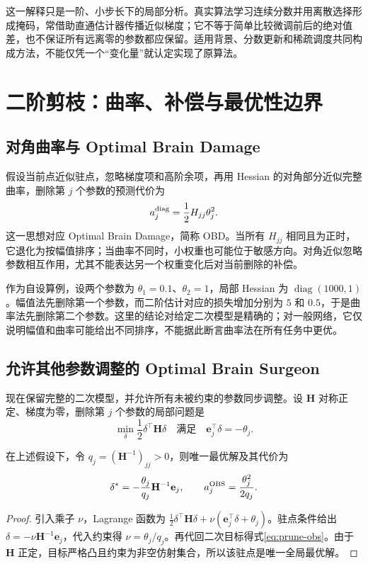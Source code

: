 \documentclass[UTF8,12pt,a4paper,fontset=fandol]{ctexart}
\begin{document}
这一解释只是一阶、小步长下的局部分析。真实算法学习连续分数并用离散选择形成掩码，常借助直通估计器传播近似梯度；它不等于简单比较微调前后的绝对值差，也不保证所有远离零的参数都应保留。适用背景、分数更新和稀疏调度共同构成方法，不能仅凭一个“变化量”就认定实现了原算法。

\section{二阶剪枝：曲率、补偿与最优性边界}
\label{sec:prune-second-order}

\subsection{对角曲率与 Optimal Brain Damage}
假设当前点近似驻点，忽略梯度项和高阶余项，再用 Hessian 的对角部分近似完整曲率，删除第 $j$ 个参数的预测代价为
\begin{equation}
 a_j^{\rm diag}=\frac12H_{jj}\theta_j^2.
 \label{eq:prune-obd}
\end{equation}
这一思想对应 Optimal Brain Damage，简称 OBD\cite{lecun1989}。当所有 $H_{jj}$ 相同且为正时，它退化为按幅值排序；当曲率不同时，小权重也可能位于敏感方向。对角近似忽略参数相互作用，尤其不能表达另一个权重变化后对当前删除的补偿。

作为自设算例，设两个参数为 $\theta_1=0.1$、$\theta_2=1$，局部 Hessian 为 $\operatorname{diag}(1000,1)$。幅值法先删除第一个参数，而二阶估计对应的损失增加分别为 $5$ 和 $0.5$，于是曲率法先删除第二个参数。这里的结论对给定二次模型是精确的；对一般网络，它仅说明幅值和曲率可能给出不同排序，不能据此断言曲率法在所有任务中更优。

\subsection{允许其他参数调整的 Optimal Brain Surgeon}
现在保留完整的二次模型，并允许所有未被约束的参数同步调整。设 $\mathbf H$ 对称正定、梯度为零，删除第 $j$ 个参数的局部问题是
\begin{equation}
 \min_\delta\frac12\delta^\top\mathbf H\delta
 \quad\text{满足}\quad\mathbf e_j^\top\delta=-\theta_j.
 \label{eq:prune-obs-problem}
\end{equation}
\begin{proposition}[单坐标删除的最优二次补偿]
\label{prop:prune-obs}
在上述假设下，令 $q_j=(\mathbf H^{-1})_{jj}>0$，则唯一最优解及其代价为
\begin{equation}
 \delta^*=-\frac{\theta_j}{q_j}\mathbf H^{-1}\mathbf e_j,
 \qquad a_j^{\rm OBS}=\frac{\theta_j^2}{2q_j}.
 \label{eq:prune-obs}
\end{equation}
\end{proposition}
\begin{proof}
引入乘子 $\nu$，Lagrange 函数为 $\tfrac12\delta^\top\mathbf H\delta+\nu(\mathbf e_j^\top\delta+\theta_j)$。驻点条件给出 $\delta=-\nu\mathbf H^{-1}\mathbf e_j$，代入约束得 $\nu=\theta_j/q_j$。再代回二次目标得式\eqref{eq:prune-obs}。由于 $\mathbf H$ 正定，目标严格凸且约束为非空仿射集合，所以该驻点是唯一全局最优解。
\end{proof}
\end{document}
